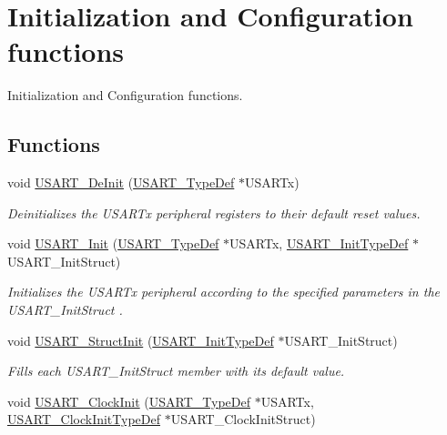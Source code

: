 \hypertarget{group___u_s_a_r_t___group1}{}\section{Initialization and Configuration functions}
\label{group___u_s_a_r_t___group1}


Initialization and Configuration functions.  


\subsection*{Functions}
\begin{DoxyCompactItemize}
\item 
void \hyperlink{group___u_s_a_r_t___group1_ga2f8e1ce72da21b6539d8e1f299ec3b0d}{U\+S\+A\+R\+T\+\_\+\+De\+Init} (\hyperlink{struct_u_s_a_r_t___type_def}{U\+S\+A\+R\+T\+\_\+\+Type\+Def} $\ast$U\+S\+A\+R\+Tx)
\begin{DoxyCompactList}\small\item\em Deinitializes the U\+S\+A\+R\+Tx peripheral registers to their default reset values. \end{DoxyCompactList}\item 
void \hyperlink{group___u_s_a_r_t___group1_ga98da340ea0324002ba1b4263e91ab2ff}{U\+S\+A\+R\+T\+\_\+\+Init} (\hyperlink{struct_u_s_a_r_t___type_def}{U\+S\+A\+R\+T\+\_\+\+Type\+Def} $\ast$U\+S\+A\+R\+Tx, \hyperlink{struct_u_s_a_r_t___init_type_def}{U\+S\+A\+R\+T\+\_\+\+Init\+Type\+Def} $\ast$U\+S\+A\+R\+T\+\_\+\+Init\+Struct)
\begin{DoxyCompactList}\small\item\em Initializes the U\+S\+A\+R\+Tx peripheral according to the specified parameters in the U\+S\+A\+R\+T\+\_\+\+Init\+Struct . \end{DoxyCompactList}\item 
void \hyperlink{group___u_s_a_r_t___group1_ga34e1faa2f312496c16cfd05155f4c8b1}{U\+S\+A\+R\+T\+\_\+\+Struct\+Init} (\hyperlink{struct_u_s_a_r_t___init_type_def}{U\+S\+A\+R\+T\+\_\+\+Init\+Type\+Def} $\ast$U\+S\+A\+R\+T\+\_\+\+Init\+Struct)
\begin{DoxyCompactList}\small\item\em Fills each U\+S\+A\+R\+T\+\_\+\+Init\+Struct member with its default value. \end{DoxyCompactList}\item 
void \hyperlink{group___u_s_a_r_t___group1_gadb50c7a2175c91acd3728f8eefd0c63d}{U\+S\+A\+R\+T\+\_\+\+Clock\+Init} (\hyperlink{struct_u_s_a_r_t___type_def}{U\+S\+A\+R\+T\+\_\+\+Type\+Def} $\ast$U\+S\+A\+R\+Tx, \hyperlink{struct_u_s_a_r_t___clock_init_type_def}{U\+S\+A\+R\+T\+\_\+\+Clock\+Init\+Type\+Def} $\ast$U\+S\+A\+R\+T\+\_\+\+Clock\+Init\+Struct)

\end{DoxyCompactItemize}
